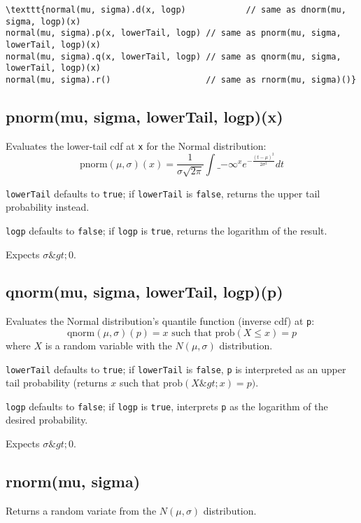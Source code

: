 \documentclass{article}
\begin{document}
\begin{lstlisting}
\texttt{normal(mu, sigma).d(x, logp)            // same as dnorm(mu, sigma, logp)(x)
normal(mu, sigma).p(x, lowerTail, logp) // same as pnorm(mu, sigma, lowerTail, logp)(x)
normal(mu, sigma).q(x, lowerTail, logp) // same as qnorm(mu, sigma, lowerTail, logp)(x)
normal(mu, sigma).r()                   // same as rnorm(mu, sigma)()}\end{lstlisting}

    \subsection*{pnorm(mu, sigma, lowerTail, logp)(x)}
    Evaluates the lower-tail cdf at \texttt{x} for the Normal distribution:
$$\textrm{pnorm}(\mu, \sigma)(x) = \frac{1}{\sigma \sqrt{2\pi}}\int\_{-\infty}^x e^{\displaystyle -\frac{(t-\mu)^2}{2\sigma^2}}dt$$


\texttt{lowerTail} defaults to \texttt{true}; if \texttt{lowerTail} is \texttt{false}, returns
the upper tail probability instead.


\texttt{logp} defaults to \texttt{false}; if \texttt{logp} is \texttt{true}, returns the logarithm
of the result.


Expects $\sigma \&gt; 0$.


    \subsection*{qnorm(mu, sigma, lowerTail, logp)(p)}
    Evaluates the Normal distribution's quantile function (inverse cdf) at \texttt{p}:
$$\textrm{qnorm}(\mu, \sigma)(p) = x \textrm{ such that } \textrm{prob}(X \leq x) = p$$
where $X$ is a random variable with the $N(\mu,\sigma)$ distribution.


\texttt{lowerTail} defaults to \texttt{true}; if \texttt{lowerTail} is \texttt{false}, \texttt{p} is
interpreted as an upper tail probability (returns
$x$ such that $\textrm{prob}(X \&gt; x) = p)$.


\texttt{logp} defaults to \texttt{false}; if \texttt{logp} is \texttt{true}, interprets \texttt{p} as
the logarithm of the desired probability.


Expects $\sigma \&gt; 0$.


    \subsection*{rnorm(mu, sigma)}
    Returns a random variate from the $N(\mu, \sigma)$ distribution.
\end{document}
